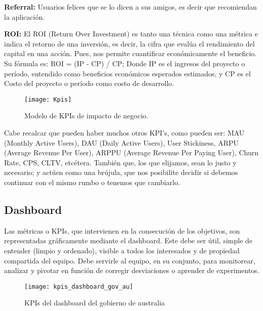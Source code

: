 \begin{description}
  \item {\textbf{Referral:} Usuarios felices que se lo dicen a sus amigos, es decir que recomiendan la aplicación.
}

  \item {\textbf{ROI:} El ROI (Return Over Investment) es tanto una técnica como una métrica e indica el retorno de una inversión, es decir, la cifra que evalúa el rendimiento del capital en una acción. Pues, nos permite cuantificar económicamente el beneficio. Su fórmula es: ROI = (IP - CP) / CP; Donde IP es el ingresos del proyecto o período, entendido como beneficios económicos esperados estimados, y CP es el Costo del proyecto o período como costo de desarrollo.
}

\end{description}

\begin{figure}[h]
  \centering
  \texttt{[image: Kpis]}
  \caption{Modelo de KPIs de impacto de negocio.}
  \centering
  \label{fig:Kpis} %
\end{figure}
\FloatBarrier %


Cabe recalcar que pueden haber muchos otros KPI’s, como pueden ser: MAU (Monthly Active Users), DAU (Daily Active Users), User Stickiness, ARPU (Average Revenue Per User), ARPPU (Average Revenue Per Paying User), Churn Rate, CPS, CLTV, etcétera. También que, los que elijamos, sean lo justo y necesario; y actúen como una brújula, que nos posibilite decidir si debemos continuar con el mismo rumbo o tenemos que cambiarlo.

\subsection{Dashboard}

Las métricas o KPIs, que intervienen en la consecución de los objetivos, son representadas gráficamente mediante el dashboard. Este debe ser útil, simple de entender (limpio y ordenado), visible a todos los interesados y de propiedad compartida del equipo. Debe servirle al equipo, en su conjunto, para monitorear, analizar y pivotar en función de corregir desviaciones o aprender de experimentos.

  \begin{figure}[h]
  \centering
  \texttt{[image: kpis\_dashboard\_gov\_au]}
  \caption{KPIs del dashboard del gobierno de australia}
  \centering
  \label{fig:kpis_dashboard_gov_au} %
  \end{figure}
  \FloatBarrier

